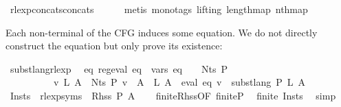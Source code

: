 \begin{isabellebody}
\ rlexp{\isacharunderscore}{\kern0pt}concats{\isacharunderscore}{\kern0pt}concats\isanewline
\ \ \ \ \isamarkupfalse%
\ {\isacharparenleft}{\kern0pt}metis\ {\isacharparenleft}{\kern0pt}mono{\isacharunderscore}{\kern0pt}tags{\isacharcomma}{\kern0pt}\ lifting{\isacharparenright}{\kern0pt}\ length{\isacharunderscore}{\kern0pt}map\ nth{\isacharunderscore}{\kern0pt}map{\isacharparenright}{\kern0pt}\isanewline
{}\isamarkupfalse%
%
\endisatagproof
{\isafoldproof}%
%
\isadelimproof
%
\endisadelimproof
%
\begin{isamarkuptext}%
Each non-terminal of the CFG induces some  equation. We do not directly construct
the equation but only prove its existence:%
\end{isamarkuptext}\isamarkuptrue%
\isamarkupfalse%
\ subst{\isacharunderscore}{\kern0pt}lang{\isacharunderscore}{\kern0pt}rlexp{\isacharcolon}{\kern0pt}\isanewline
\ \ {\isachardoublequoteopen}{\isasymexists}eq{\isachardot}{\kern0pt}\ reg{\isacharunderscore}{\kern0pt}eval\ eq\ {\isasymand}\ vars\ eq\ {\isasymsubseteq}\ {\isasymgamma}{\isacharprime}{\kern0pt}\ {\isacharbackquote}{\kern0pt}\ Nts\ P\isanewline
\ \ \ \ \ \ \ \ \ {\isasymand}\ {\isacharparenleft}{\kern0pt}{\isasymforall}v\ L{\isachardot}{\kern0pt}\ {\isacharparenleft}{\kern0pt}{\isasymforall}A\ {\isasymin}\ Nts\ P{\isachardot}{\kern0pt}\ v\ {\isacharparenleft}{\kern0pt}{\isasymgamma}{\isacharprime}{\kern0pt}\ A{\isacharparenright}{\kern0pt}\ {\isacharequal}{\kern0pt}\ L\ A{\isacharparenright}{\kern0pt}\ {\isasymlongrightarrow}\ eval\ eq\ v\ {\isacharequal}{\kern0pt}\ subst{\isacharunderscore}{\kern0pt}lang\ P\ L\ A{\isacharparenright}{\kern0pt}{\isachardoublequoteclose}\isanewline
%
\isadelimproof
%
\endisadelimproof
%
\isatagproof
{}\isamarkupfalse%
\ {\isacharminus}{\kern0pt}\isanewline
\ \ \isamarkupfalse%
\ {\isacharquery}{\kern0pt}Insts\ {\isacharequal}{\kern0pt}\ {\isachardoublequoteopen}rlexp{\isacharunderscore}{\kern0pt}syms\ {\isacharbackquote}{\kern0pt}\ {\isacharparenleft}{\kern0pt}Rhss\ P\ A{\isacharparenright}{\kern0pt}{\isachardoublequoteclose}\isanewline
\ \ \isamarkupfalse%
\ finite{\isacharunderscore}{\kern0pt}Rhss{\isacharbrackleft}{\kern0pt}OF\ finite{\isacharunderscore}{\kern0pt}P{\isacharbrackright}{\kern0pt}\ \isamarkupfalse%
\ {\isachardoublequoteopen}finite\ {\isacharquery}{\kern0pt}Insts{\isachardoublequoteclose}\ \isamarkupfalse%
\ simp\isanewline

\end{isabellebody}
